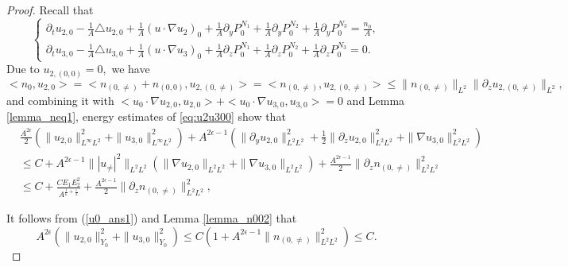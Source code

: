 \documentclass[12pt, reqno]{amsart}
\numberwithin{equation}{section}
\begin{document}
	\begin{proof}
		Recall that 
		\begin{equation}\label{eq:u2u300}
			\left\{
			\begin{array}{lr}
				\partial_tu_{2,0}-\frac{1}{A}\triangle u_{2,0}
				+\frac{1}{A}(u\cdot\nabla u_{2})_0
				+\frac{1}{A}\partial_yP^{N_1}_0
				+\frac{1}{A}\partial_y P^{N_2}_0+\frac{1}{A}\partial_y P^{N_3}_0=\frac{n_0}{A}, \\
				\partial_tu_{3,0}-\frac{1}{A}\triangle u_{3,0}
				+\frac{1}{A}(u\cdot\nabla u_3)_0
				+\frac{1}{A}\partial_zP^{N_1}_0
				+\frac{1}{A}\partial_z P^{N_2}_0
				+\frac{1}{A}\partial_z P^{N_3}_0=0.
			\end{array}
			\right.
		\end{equation}		
		Due to 
		$u_{2,(0,0)}=0,$
		we have 
		$$<n_0,u_{2,0}>=<n_{(0,\neq)}+n_{(0,0)},u_{2,(0,\neq)}>=<n_{(0,\neq)},u_{2,(0,\neq)}>\leq
		\|n_{(0,\neq)}\|_{L^2}\|\partial_z u_{2,(0,\neq)}\|_{L^2},$$
		and combining it with $<u_0\cdot\nabla u_{2,0},u_{2,0}>+<u_0\cdot\nabla u_{3,0},u_{3,0}>=0$ and Lemma \ref{lemma_neq1}, 
		energy estimates of \eqref{eq:u2u300} show that 
		\begin{equation}\label{u0_ans11}
			\begin{aligned}
				&\frac{A^{2\epsilon}}{2}(\|u_{2,0}\|_{L^{\infty}L^2}^2+\|u_{3,0}\|_{L^{\infty}L^2}^2)
				+A^{2\epsilon-1}(\|\partial_y u_{2,0}\|_{L^2L^2}^2
				+\frac{1}{2}\|\partial_z u_{2,0}\|_{L^2L^2}^2
				+\|\nabla u_{3,0}\|_{L^2L^2}^2)\\
				&\leq C+A^{2\epsilon-1}\||u_{\neq}|^2\|_{L^2L^2}
				(\|\nabla u_{2,0}\|_{L^2L^2}+\|\nabla u_{3,0}\|_{L^2L^2})
				+\frac{A^{2\epsilon-1}}{2}\|\partial_z n_{(0,\neq)}\|_{L^2L^2}^2\\
				&\leq C+\frac{CE_1E_2^2}{A^{\frac{1}{6}+\frac{\epsilon}{2}}}
				+\frac{A^{2\epsilon-1}}{2}\|\partial_zn_{(0,\neq)}\|_{L^2L^2}^2,
			\end{aligned}
		\end{equation}
		
		It follows from (\ref{u0_ans1}) and Lemma \ref{lemma_n002} that 
		$$A^{2\epsilon}(\|u_{2,0}\|^2_{Y_0}+\|u_{3,0}\|^2_{Y_0})\leq C(1+A^{2\epsilon-1}\|n_{(0,\neq)}\|^2_{L^2L^2})\leq C.$$
		

\end{proof}
\end{document}
